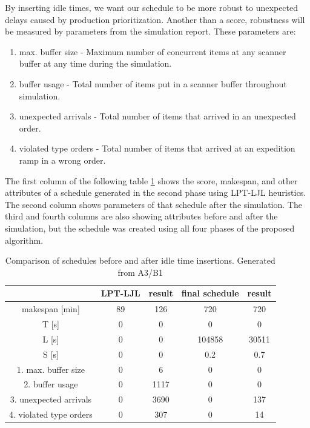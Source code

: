 \documentclass{ctuthesis}
\begin{document}
By inserting idle times, we want our schedule to be more robust to unexpected delays caused by production prioritization. Another than a score, robustness will be measured by parameters from the simulation report. These parameters are:

\begin{enumerate}
    \item max. buffer size - Maximum number of concurrent items at any scanner buffer at any time during the simulation.
    \item buffer usage - Total number of items put in a scanner buffer throughout simulation.
    \item unexpected arrivals - Total number of items that arrived in an unexpected order.
    \item violated type orders - Total number of items that arrived at an expedition ramp in a wrong order.
\end{enumerate}

The first column of the following table  \ref{tab:idle1} shows the score, makespan, and other attributes of a schedule generated in the second phase using LPT-LJL heuristics. The second column shows parameters of that schedule after the simulation. The third and fourth columns are also showing attributes before and after the simulation, but the schedule was created using all four phases of the proposed algorithm.

\begin{table}[H]
\begin{tabular}{ |c|| c | c | c | c |} 
\hline
 & LPT-LJL & result & final schedule & result \\ 
\hline
makespan [min] & 89 & 126 & 720 & 720 \\
\hline
T [s]& 0 & 0 & 0 & 0 \\
\hline
L [s]& 0 & 0 & 104858 & 30511 \\
\hline
S [s]& 0 & 0 & 0.2 & 0.7 \\
\hline
1. max. buffer size & 0 & 6 & 0 & 0\\ 
\hline
2. buffer usage  & 0 & 1117 & 0 & 0\\ 
\hline
3. unexpected arrivals & 0 & 3690 & 0 & 137\\ 
\hline
4. violated type orders & 0 & 307 & 0 & 14\\ 
\hline
\end{tabular}
\caption{Comparison of schedules before and after idle time insertions. Generated from A3/B1} \label{tab:idle1}
\end{table}
\end{document}
